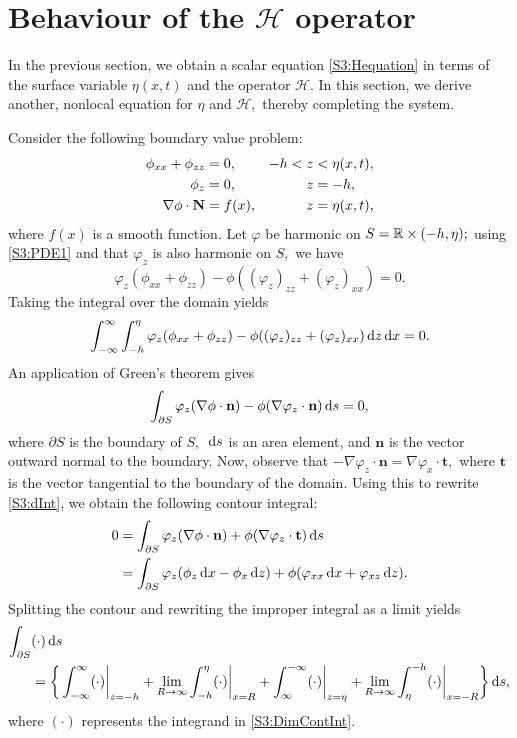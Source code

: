 \section{Behaviour of the $\mathcal{H}$ operator}
In the previous section, we obtain a scalar equation \eqref{S3:Hequation} in terms of the surface variable $\eta(x,t)$ and the operator $\mathcal{H}.$ In this section, we derive another, nonlocal equation for $\eta$ and $\mathcal{H},$ thereby completing the system.

Consider the following boundary value problem:
\begin{subequations}
\begin{align}
\phi_{xx} + \phi_{zz} &= 0, &-h < z &< \eta(x,t), \label{S3:PDE1}\\
\phi_{z} &= 0, &z &= -h, \label{S3:BBC1}\\
\nabla  \phi \cdot {\bf N} &= f(x), & z &= \eta(x,t), \label{S3:KBC1}
\end{align}
\end{subequations}
where $f(x)$ is a smooth function. Let $\varphi$ be harmonic on $S = \mathbb R \times (-h, \eta);$ using \eqref{S3:PDE1} and that $\varphi_z$ is also harmonic on $S,$ we have
\[ \varphi_z(\phi_{xx} + \phi_{zz}) - \phi((\varphi_z)_{zz} + (\varphi_{z})_{xx}) = 0. \]
Taking the integral over the domain yields
\[ \int^{\infty}_{-\infty} \int^{\eta}_{-h} \varphi_z(\phi_{xx} + \phi_{zz}) - \phi((\varphi_z)_{zz} + (\varphi_{z})_{xx}) \,\mathrm{d} z \,\mathrm{d} x = 0.\]
An application of Green's theorem gives 
\begin{equation}\label{S3:dInt}
\int_{\partial S} \varphi_z(\nabla  \phi \cdot \textbf{n}) - \phi(\nabla  \varphi_z \cdot \textbf{n}) \,\mathrm{d} s = 0,
\end{equation} 
where $\partial S$ is the boundary of $S,$ $\,\mathrm{d} s$ is an area element, and $\textbf{n}$ is the vector outward normal to the boundary. Now, observe that $- \nabla \varphi_z \cdot \textbf{n} = \nabla  \varphi_x \cdot \textbf{t},$ where $\textbf{t}$ is the vector tangential to the boundary of the domain. Using this to rewrite \eqref{S3:dInt}, we obtain the following contour integral:
\begin{align}
0 &= \int_{\partial S} \varphi_z(\nabla  \phi \cdot \textbf{n}) + \phi(\nabla  \varphi_z \cdot \textbf{t}) \,\mathrm{d} s \nonumber \\
&= \int_{\partial S} \varphi_z (\phi_z \,\mathrm{d} x - \phi_x \,\mathrm{d} z) + \phi(\varphi_{xx} \,\mathrm{d} x + \varphi_{xz} \,\mathrm{d} z). \label{S3:DimContInt}
\end{align}
Splitting the contour and rewriting the improper integral as a limit yields
\begin{align*}
\int_{\partial S}&(\cdot) \,\mathrm{d} s \\
&=  \bigg\{\int^{\infty}_{-\infty} (\cdot) \bigg|_{z = -h} + \lim_{R \to \infty} \int_{-h}^{\eta} (\cdot) \bigg|_{x = R} + \int_{\infty}^{-\infty} (\cdot) \bigg|_{z=\eta} + \lim_{R \to \infty}\int_{\eta}^{-h}(\cdot) \bigg|_{x = -R} \bigg\} \,\mathrm{d} s,
\end{align*}
where $(\cdot)$ represents the integrand in \eqref{S3:DimContInt}. 

